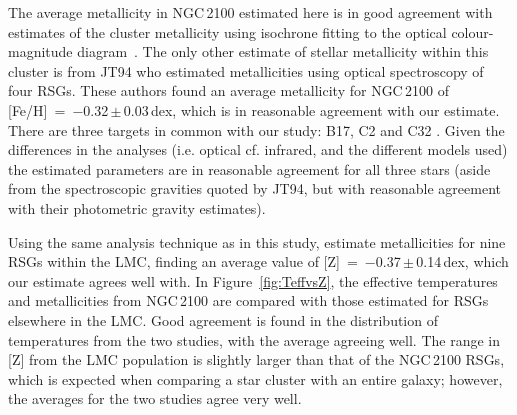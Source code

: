 The average metallicity in NGC\,2100 estimated here is in good agreement with estimates of the cluster metallicity using isochrone fitting to the optical colour-magnitude diagram~\citep[$-$0.34\,dex;][]{2015A&A...575A..62N}.
The only other estimate of stellar metallicity within this cluster is from JT94
who estimated metallicities using optical spectroscopy of four RSGs.
These authors found an average metallicity for NGC\,2100 of [Fe/H]~=~$-$0.32\,$\pm$\,0.03\,dex, which is in reasonable agreement with our estimate.
There are three targets in common with our study: B17, C2 and C32
\citep[using the][nomenclature]{1974A&AS...15..261R}.
Given the differences in the analyses (i.e. optical cf. infrared, and the different models used) the estimated parameters are in reasonable agreement for all three stars
(aside from the spectroscopic gravities quoted by JT94, but with reasonable agreement with their photometric gravity estimates).

Using the same analysis technique as in this study,
\cite{2015ApJ...806...21D} estimate metallicities for nine RSGs within the LMC,
finding an average value of [Z]~=~$-$0.37\,$\pm$\,0.14\,dex, which our estimate agrees well with.
In Figure~\ref{fig:TeffvsZ}, the effective temperatures and metallicities from NGC\,2100 are compared with those estimated for RSGs elsewhere in the LMC.
Good agreement is found in the distribution of temperatures from the two studies, with the average agreeing well.
The range in [Z] from the LMC population is slightly larger than that of the NGC\,2100 RSGs, which is expected when comparing a star cluster with an entire galaxy; however, the averages for the two studies agree very well.

